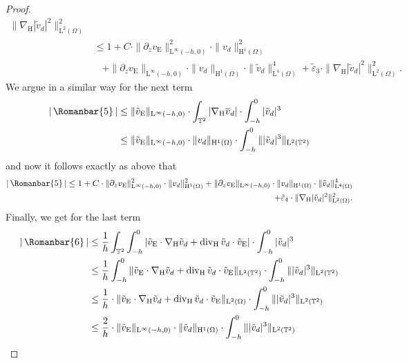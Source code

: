 \documentclass[preprint]{elsarticle}
\numberwithin{equation}{section}
\newcommand {\T}	{\mathbb{T}}
\DeclareMathOperator{\divH}{div_{\H}}
\renewcommand{\H}{\mathrm{H}}
\newcommand{\dk}[1]{\partial_{#1}}
\newcommand{\dz}{\dk{z}}
\renewcommand{\bar}[1]{\overline{#1}}
\newcommand{\vbar}{\bar{v}}
\newcommand{\vtilde}{\tilde{v}}
\newcommand{\nablaH}{\nabla_{\H}}
\newcommand{\rL}{\mathrm{L}}
\newcommand{\rH}{\H}
\newcommand{\rE}{\mathrm{E}}
\newcommand{\V}{\, \Romanbar{5}\, }
\newcommand{\VI}{\, \Romanbar{6}\, }
\begin{document}
\begin{proof}
\begin{align*}
		\| \nablaH |\vtilde_d|^2 \|_{\rL^2(\Omega)}^2 \\
		&\leq 1 + C \cdot 
		\| \dz v_{\rE} \|_{\rL^\infty(-h,0)}^2 \cdot \| v_d \|_{\rH^1(\Omega)}^2 \\
		&\hspace{10pt} + \| \dz v_{\rE} \|_{\rL^\infty(-h,0)} \cdot \| v_d \|_{\rH^1(\Omega)} \cdot \| \vtilde_d \|_{\rL^4(\Omega)}^4 
		+ \tilde{\varepsilon}_3 \cdot 
		\| \nablaH |\vtilde_d|^2 \|_{\rL^2(\Omega)}^2 .
	\end{align*}
	We argue in a similar way for the next term
	\begin{align*}
		| \V | &\leq \| \vtilde_{\rE}\|_{\rL^\infty(-h,0)} \cdot \int_{\T^2} |\nablaH \vbar_d | \cdot \int_{-h}^0 |\vtilde_d|^3 \\
		&\leq \| \vtilde_{\rE}\|_{\rL^\infty(-h,0)} \cdot  \| v_d \|_{\rH^1(\Omega)} \cdot \int_{-h}^0  \| |\vtilde_d|^3 \|_{\rL^2(\T^2)}
	\end{align*}
	and now it follows exactly as above that
	\begin{align*}
		| \V |
		\leq 1 + C \cdot 
		\| \dz v_{\rE} \|_{\rL^\infty(-h,0)}^2 \cdot \| v_d \|_{\rH^1(\Omega)}^2 + \| \dz v_{\rE} \|_{\rL^\infty(-h,0)} \cdot \| v_d \|_{\rH^1(\Omega)} \cdot \| \vtilde_d \|_{\rL^4(\Omega)}^4 \\
		+ \tilde{\varepsilon}_4 \cdot 
		\| \nablaH |\vtilde_d|^2 \|_{\rL^2(\Omega)}^2 .
	\end{align*}
	Finally, we get for the last term
	\begin{align*}
		|\VI|
		&\leq \frac{1}{h} \int_{\T^2} \int_{-h}^0 |\vtilde_{\rE} \cdot \nablaH \vtilde_d + \divH \vtilde_d \cdot \vtilde_{\rE}| \cdot \int_{-h}^0 |\vtilde_d|^3 \\
		&\leq \frac{1}{h} \int_{-h}^0 \| \vtilde_{\rE} \cdot \nablaH \vtilde_d + \divH \vtilde_d \cdot \vtilde_{\rE} \|_{\rL^2(\T^2)} \cdot \int_{-h}^0 \| |\vtilde_d|^3 \|_{\rL^2(\T^2)} \\
		&\leq \frac{1}{h} \cdot \| \vtilde_{\rE} \cdot \nablaH \vtilde_d + \divH \vtilde_d \cdot \vtilde_{\rE} \|_{\rL^2(\Omega)} \cdot \int_{-h}^0 \| |\vtilde_d|^3 \|_{\rL^2(\T^2)} \\
		&\leq \frac{2}{h} \cdot \| \vtilde_{\rE} \|_{\rL^\infty(-h,0)} \cdot \| \vtilde_d \|_{\rH^1(\Omega)} \cdot \int_{-h}^0 \| |\vtilde_d|^3 \|_{\rL^2(\T^2)}
	\end{align*}

\end{proof}
\end{document}

